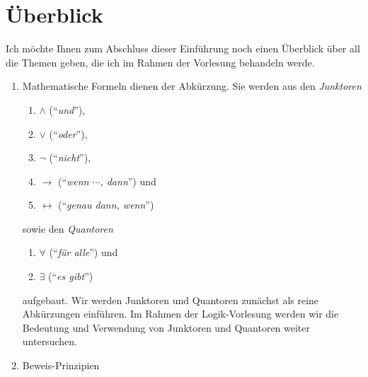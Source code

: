 
\section{\"{U}berblick}
Ich m\"{o}chte Ihnen zum Abschluss dieser Einf\"{u}hrung noch einen \"{U}berblick \"{u}ber all die Themen geben, die
ich im Rahmen der Vorlesung behandeln werde.  
\begin{enumerate}
\item Mathematische Formeln dienen der Abk\"{u}rzung.  Sie werden aus den \emph{Junktoren} 
      \begin{enumerate}
      \item $\wedge$ (``\emph{und}''),
      \item $\vee$ (``\emph{oder}''),
      \item $\neg$ (``\emph{nicht}''),
      \item $\rightarrow$ (``\emph{wenn $\cdots$, dann}'') und
      \item $\leftrightarrow$ (``\emph{genau dann, wenn}'') 
      \end{enumerate}
      sowie den \emph{Quantoren}
      \begin{enumerate}
      \item $\forall$ (``\emph{f\"{u}r alle}'') und
      \item $\exists$ (``\emph{es gibt}'') 
      \end{enumerate}
      aufgebaut.
      Wir werden  Junktoren und Quantoren zun\"{a}chst
      als reine Abk\"{u}rzungen einf\"{u}hren.  Im Rahmen der Logik-Vorlesung werden wir die Bedeutung
      und Verwendung von Junktoren und Quantoren weiter untersuchen.
\item Beweis-Prinzipien


\end{enumerate}
